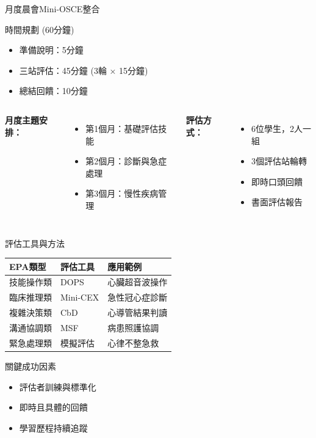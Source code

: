 \documentclass[aspectratio=169]{beamer}
\begin{document}
\begin{frame}{月度晨會Mini-OSCE整合}
\begin{block}{時間規劃 (60分鐘)}
\begin{itemize}
\item 準備說明：5分鐘
\item 三站評估：45分鐘 (3輪 × 15分鐘)
\item 總結回饋：10分鐘
\end{itemize}
\end{block}

\begin{columns}[c]
\textbf{月度主題安排：}
\begin{itemize}
\item 第1個月：基礎評估技能
\item 第2個月：診斷與急症處理
\item 第3個月：慢性疾病管理
\end{itemize}

\textbf{評估方式：}
\begin{itemize}
\item 6位學生，2人一組
\item 3個評估站輪轉
\item 即時口頭回饋
\item 書面評估報告
\end{itemize}
\end{columns}
\end{frame}

\begin{frame}{評估工具與方法}
\begin{table}
\centering
\scriptsize
\begin{tabular}{lll}
\hline
\textbf{EPA類型} & \textbf{評估工具} & \textbf{應用範例} \\
\hline
技能操作類 & DOPS & 心臟超音波操作 \\
\hline
臨床推理類 & Mini-CEX & 急性冠心症診斷 \\
\hline
複雜決策類 & CbD & 心導管結果判讀 \\
\hline
溝通協調類 & MSF & 病患照護協調 \\
\hline
緊急處理類 & 模擬評估 & 心律不整急救 \\
\hline
\end{tabular}
\end{table}

\vspace{0.5cm}
\begin{alertblock}{關鍵成功因素}
\begin{itemize}
\item 評估者訓練與標準化
\item 即時且具體的回饋
\item 學習歷程持續追蹤
\end{itemize}
\end{alertblock}
\end{frame}
\end{document}
